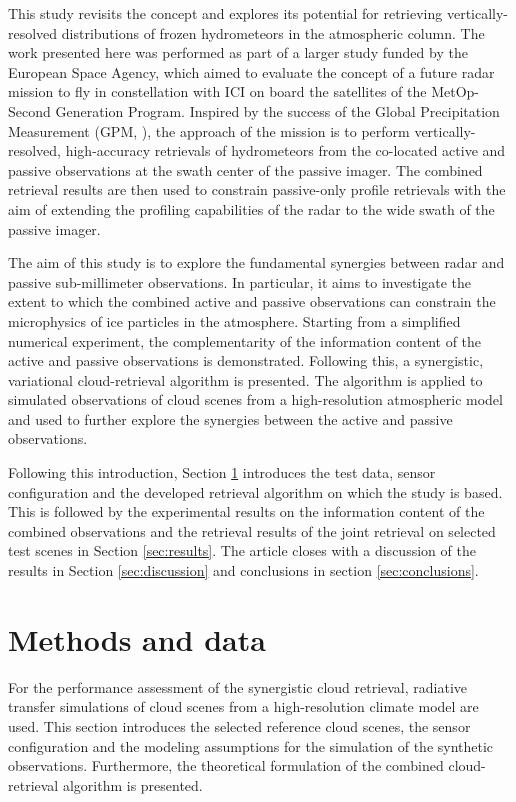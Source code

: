 \documentclass[journal abbreviation, manuscript]{copernicus}
\begin{document}
This study revisits the concept and explores its potential for retrieving
vertically-resolved distributions of frozen hydrometeors in the atmospheric
column. The work presented here was performed as part of a larger study funded
by the European Space Agency, which aimed to evaluate the concept of a future
radar mission to fly in constellation with ICI on board the satellites of the
MetOp-Second Generation Program. Inspired by the success of the Global
Precipitation Measurement (GPM, \cite{hou14}), the approach of the mission is to
perform vertically-resolved, high-accuracy retrievals of hydrometeors from the
co-located active and passive observations at the swath center of the passive
imager. The combined retrieval results are then used to constrain passive-only
profile retrievals with the aim of extending the profiling capabilities of the
radar to the wide swath of the passive imager.

The aim of this study is to explore the fundamental synergies between radar and
passive sub-millimeter observations. In particular, it aims to investigate the
extent to which the combined active and passive observations can constrain the
microphysics of ice particles in the atmosphere. Starting from a simplified
numerical experiment, the complementarity of the information content of the
active and passive observations is demonstrated. Following this, a synergistic,
variational cloud-retrieval algorithm is presented. The algorithm is applied to
simulated observations of cloud scenes from a high-resolution atmospheric model
and used to further explore the synergies between the active and passive
observations.

Following this introduction, Section \ref{sec:methods_and_data} introduces the
test data, sensor configuration and the developed retrieval algorithm on which
the study is based. This is followed by the experimental results on the
information content of the combined observations and the retrieval results of
the joint retrieval on selected test scenes in Section \ref{sec:results}. The
article closes with a discussion of the results in Section \ref{sec:discussion}
and conclusions in section \ref{sec:conclusions}.


\section{Methods and data}
\label{sec:methods_and_data}

For the performance assessment of the synergistic cloud retrieval, radiative
transfer simulations of cloud scenes from a high-resolution climate model are
used. This section introduces the selected reference cloud scenes, the sensor
configuration and the modeling assumptions for the simulation of the synthetic
observations. Furthermore, the theoretical formulation of the combined
cloud-retrieval algorithm is presented.
\end{document}
